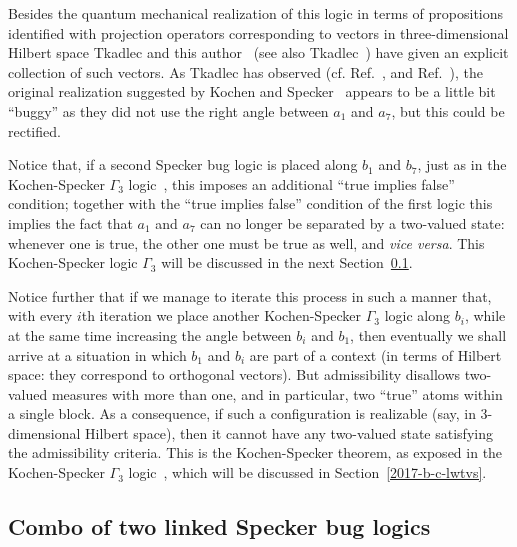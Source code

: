\documentclass[%
  twocolumn,
 showpacs,
 showkeys,
 preprintnumbers,
 amsmath,amssymb,
 aps,
  pra,
  longbibliography,
 floatfix,
 ]{revtex4-1}
\begin{document}
Besides the  quantum mechanical realization of this logic in terms of propositions identified with projection operators
corresponding to vectors in three-dimensional Hilbert space
Tkadlec and this author~\cite[p.~5387, Fig.~4]{svozil-tkadlec}
(see also Tkadlec~\cite[p.~206, Fig.~1]{tkadlec-96}) have given  an explicit collection of such vectors.
As Tkadlec has observed (cf. Ref.~\cite[p.~5390]{svozil-tkadlec}, and Ref.~\cite[p.]{tkadlec-01}),
the original realization suggested by Kochen and Specker~\cite{kochen1} appears to be a little bit ``buggy''
as they did not use the right angle between $a_1$ and $a_7$, but this could be rectified.


Notice that, if a second Specker bug logic is placed along $b_1$ and $b_7$,
just as in the Kochen-Specker $\Gamma_3$ logic~\cite[p.~70]{kochen1},
this imposes an additional ``true implies false'' condition; together with the
 ``true implies false'' condition of the first logic this
implies the fact that $a_1$ and $a_7$ can no longer be separated by a two-valued state: whenever one is true,
the other one must be true as well, and {\em vice versa}.
This Kochen-Specker logic $\Gamma_3$ will be discussed in the next Section~\ref{2017-b-bugscombino}.

Notice further that if we manage to iterate this process in such a manner that,
with every $i$th iteration we place another Kochen-Specker $\Gamma_3$ logic  along $b_i$,
while at the same time increasing the angle between $b_i$ and $b_1$,
then eventually we shall arrive at a situation in which $b_1$ and $b_i$ are part of a context
(in terms of Hilbert space: they correspond to orthogonal vectors).
But admissibility disallows two-valued measures with more than one, and in particular,
two ``true'' atoms within a single block. As a consequence, if such a configuration is
realizable (say, in 3-dimensional Hilbert space), then it cannot have any two-valued state
satisfying the admissibility criteria.
This is the Kochen-Specker theorem, as exposed in the  Kochen-Specker $\Gamma_3$ logic~\cite[p.~69]{kochen1},
which will be discussed in Section~\ref{2017-b-c-lwtvs}.


\subsection{Combo of two linked Specker bug logics}
\label{2017-b-bugscombino}
\end{document}

